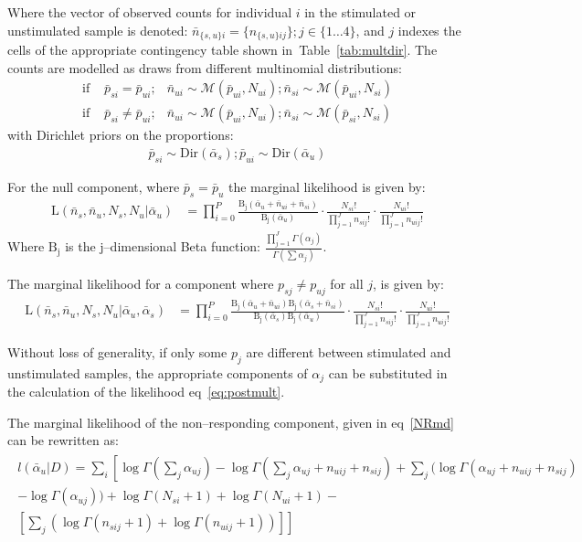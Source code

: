 \documentclass[11pt]{article}
\begin{document}
Where the vector of observed counts for individual $i$ in the stimulated or unstimulated sample is denoted: $\bar{n}_{\{s,u\}i} = \{n_{\{s,u\}ij}\} ; j\in\{1\ldots 4\}$, and $j$ indexes the cells of the appropriate contingency table shown in~Table~\ref{tab:multdir}. The counts are modelled as draws from different multinomial distributions:
\begin{align}
\text{if } & \bar{p}_{si}=\bar{p}_{ui};& \bar{n}_{ui} \sim \mathcal{M}(\bar{p}_{ui},N_{ui});\bar{n}_{si} \sim \mathcal{M}(\bar{p}_{ui},N_{si})\\
\text{if } & \bar{p}_{si} \ne \bar{p}_{ui};& \bar{n}_{ui} \sim \mathcal{M}(\bar{p}_{ui},N_{ui});\bar{n}_{si} \sim \mathcal{M}(\bar{p}_{si},N_{si})
\end{align}
with Dirichlet priors on the proportions:
\begin{align}
\bar{p}_{si} \sim \mathrm{Dir}(\bar{\alpha}_s) ; \bar{p}_{ui} \sim \mathrm{Dir}(\bar{\alpha}_u)
\end{align}

For the null component, where $\bar{p}_{s}=\bar{p}_{u}$ the marginal likelihood is given by: 
\begin{align}
\mathrm{L}(\bar{n}_s,\bar{n}_u,N_s,N_u|\bar{\alpha}_u) &= \prod_{i=0}^P\frac{ \mathrm{B_j}(\bar{\alpha}_{u}+\bar{n}_{ui}+\bar{n}_{si})}{\mathrm{B_j}(\bar{\alpha}_u)} \cdot \frac{N_{si}!}{\prod_{j=1}^J n_{sij}!} \cdot \frac{N_{ui}!}{\prod_{j=1}^J n_{uij}!}\label{NRmd}
\end{align}
Where $\mathrm{B_j}$ is the $\mathrm{j}$--dimensional Beta function: $\frac{\prod_{j=1}^J\Gamma(\alpha_j)}{\Gamma(\sum\alpha_j)}$.

The marginal likelihood for a component where $p_{sj} \ne p_{uj}$ for all $j$, is given by:
\begin{align}
\mathrm{L}(\bar{n}_s,\bar{n}_u,N_s,N_u|\bar{\alpha}_u,\bar{\alpha}_s) &= \prod_{i=0}^P\frac{  \mathrm{B_j}(\bar{\alpha}_{u}+\bar{n}_{ui}) \mathrm{B_j}(\bar{\alpha}_{s}+\bar{n}_{si})}{\mathrm{B_j}(\bar{\alpha}_s)\mathrm{B_j}(\bar{\alpha}_u)} \cdot \frac{N_{si}!}{\prod_{j=1}^J n_{sij}!} \cdot \frac{N_{ui}!}{\prod_{j=1}^J n_{uij}!}\label{eq:postmult}
\end{align}

Without loss of generality, if only some $p_j$ are different between stimulated and unstimulated samples, the appropriate components of $\alpha_j$  can be substituted in the calculation of the likelihood eq~\eqref{eq:postmult}.


The marginal likelihood of the non--responding component, given in eq~\eqref{NRmd} can be rewritten as:
\begin{align}
\begin{split}
l(\bar{\alpha}_u|D)=\sum_i \left[ \log \Gamma (\sum_j \alpha_{uj}) - \log \Gamma (\sum_j \alpha_{uj}+n_{uij}+n_{sij})+ \sum_j (\log \Gamma(\alpha_{uj}+n_{uij}+n_{sij}) \right.\\ \left. -\log\Gamma(\alpha_{uj}))+ \log\Gamma(N_{si}+1) +\log\Gamma(N_{ui}+1)-\right.\\ \left.\left[\sum_j(\log\Gamma(n_{sij}+1)+\log\Gamma(n_{uij}+1))\right]\right]\label{mdloglike}
\end{split}
\end{align}
\end{document}
